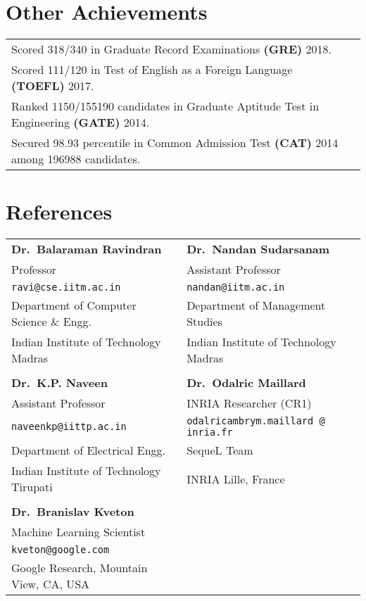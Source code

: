 \documentclass[margin,11pt]{res}
\begin{document}
\begin{resume}
\section{Other Achievements}
\begin{tabular}{p{12cm}p{80cm}}
Scored 318/340 in Graduate Record Examinations \textbf{(GRE)} 2018.\\
Scored 111/120 in Test of English as a Foreign Language \textbf{(TOEFL)} 2017.\\
Ranked 1150/155190 candidates in Graduate Aptitude Test in Engineering \textbf{(GATE)} 2014. \\
Secured 98.93 percentile in Common Admission Test \textbf{(CAT)} 2014 among 196988 candidates.
\end{tabular}

\section{References}
\begin{tabular}{lll}
\textbf{Dr.~Balaraman Ravindran} & \textbf{Dr.~Nandan Sudarsanam} \\
Professor & Assistant Professor\\
\texttt{ravi@cse.iitm.ac.in} & \texttt{nandan@iitm.ac.in}\\
Department of Computer Science \& Engg. & Department of Management Studies\\ 
Indian Institute of Technology Madras & Indian Institute of Technology Madras\\
\\
\textbf{Dr.~K.P. Naveen}  & \textbf{Dr.~Odalric Maillard} \\
Assistant Professor & INRIA Researcher (CR1) \\
\texttt{naveenkp@iittp.ac.in} & \texttt{odalricambrym.maillard @ inria.fr}\\
Department of Electrical Engg. & SequeL Team \\ 
Indian Institute of Technology Tirupati & INRIA Lille, France\\
\\
\textbf{Dr.~Branislav Kveton}\\
Machine Learning Scientist\\
\texttt{kveton@google.com}\\
Google Research, Mountain View, CA, USA
\end{tabular}



\end{resume}
\end{document}
